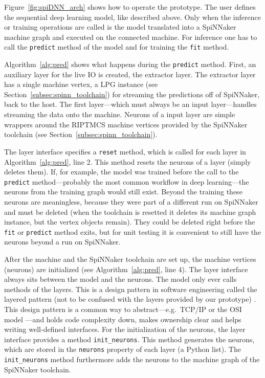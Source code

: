 \documentclass[]{article}
\begin{document}
Figure~\ref{fig:spiDNN_arch} shows how to operate the prototype.
The user defines the sequential deep learning model, like described
above.
Only when the inference or training operations are called is the
model translated into a SpiNNaker machine graph and executed on the
connected machine.
For inference one has to call the \texttt{predict} method of the
model and for training the \texttt{fit} method.

Algorithm~\ref{alg:pred} shows what happens during the
\texttt{predict} method.
First, an auxiliary layer for the live IO is created, the extractor
layer.
The extractor layer has a single machine vertex, a LPG instance
(see Section~\ref{subsec:spinn_toolchain}) for streaming the
predictions off of SpiNNaker, back to the host.
The first layer---which must always be an input layer---handles
streaming the data onto the machine.
Neurons of a input layer are simple wrappers around the RIPTMCS
machine vertices provided by the SpiNNaker toolchain (see
Section~\ref{subsec:spinn_toolchain}).

The layer interface specifies a \texttt{reset} method, which is
called for each layer in Algorithm~\ref{alg:pred}, line 2.
This method resets the neurons of a layer (simply deletes them).
If, for example, the model was trained before the call to the
\texttt{predict} method---probably the most common workflow in deep
learning---the neurons from the training graph would still exist.
Beyond the training these neurons are meaningless, because they were
part of a different run on SpiNNaker and must be deleted (when the
toolchain is resetted it deletes its machine graph instance, but the
vertex objects remain).
They could be deleted right before the \texttt{fit} or
\texttt{predict} method exits, but for unit testing it is convenient
to still have the neurons beyond a run on SpiNNaker.

After the machine and the SpiNNaker toolchain are set up, the
machine vertices (neurons) are initialized
(see Algorithm~\ref{alg:pred}, line 4).
The layer interface always sits between the model and the neurons.
The model only ever calls methods of the layers.
This is a design pattern in software engineering called the layered
pattern (not to be confused with the layers provided by our
prototype) \citep{morlion_2018}.
This design pattern is a common way to abstract---e.g.\ TCP/IP or the
OSI model \citep{tanenbaum_et_al_2013}---and holds code complexity
down, makes ownership clear and helps writing well-defined interfaces.
For the initialization of the neurons, the layer interface provides
a method \texttt{init\_neurons}.
This method generates the neurons, which are stored in the
\texttt{neurons} property of each layer (a Python list).
The \texttt{init\_neurons} method furthermore adds the neurons to
the machine graph of the SpiNNaker toolchain.
\end{document}
